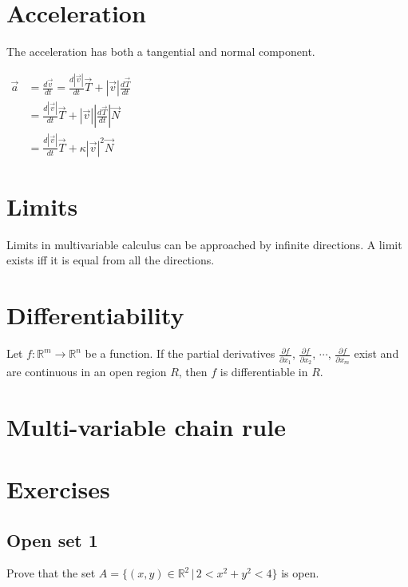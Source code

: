 \documentclass[a4paper]{article}
\begin{document}
\section{Acceleration}

The acceleration has both a tangential and normal component.

$\begin{aligned} \vec{a} & =\frac{d \vec{v}}{d t}=\frac{d|\vec{v}|}{d t} \vec{T}+|\vec{v}| \frac{d \vec{T}}{d t} \\ & =\frac{d|\vec{v}|}{d t} \vec{T}+|\vec{v}|\left|\frac{d \vec{T}}{d t}\right| \vec{N} \\ & =\frac{d|\vec{v}|}{d t} \vec{T}+\kappa|\vec{v}|^2 \vec{N}\end{aligned}$

\section{Limits}

Limits in multivariable calculus can be approached by infinite directions.
A limit exists iff it is equal from all the directions.

\section{Differentiability}


Let \(f\colon {\mathbb{R}}^m \to {\mathbb{R}}^n\) be a function.
If the partial derivatives \(\frac{\partial f}{\partial x_1}\), \(\frac{\partial f}{\partial x_2}\),
\(\cdots\), \(\frac{\partial f}{\partial x_m}\) exist and are continuous in an open region \(R\), then \(f\) is differentiable in \(R\).

\section{Multi-variable chain rule}

\pagebreak

\section{Exercises}

\subsection{Open set 1}

Prove that the set \(A=\{(x,y) \in {\mathbb{R}}^2 \,|\, 2<x^2+y^2<4\}\)
is open.
\end{document}
